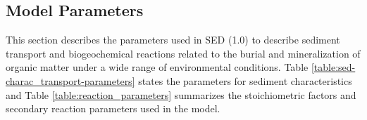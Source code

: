 \documentclass[gmd, manuscript]{copernicus}
\begin{document}

\subsection{Model Parameters}
This section describes the parameters used in SED (1.0) to describe sediment transport and biogeochemical reactions related to the burial and mineralization of organic matter under a wide range of environmental conditions. 
Table \ref{table:sed-charac_transport-parameters} states the parameters for sediment characteristics and Table \ref{table:reaction_parameters} summarizes the stoichiometric factors and 
secondary reaction parameters used in the model.
\end{document}
